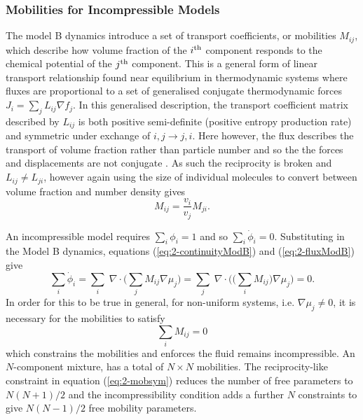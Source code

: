 \subsubsection{Mobilities for Incompressible Models} \label{subsec:mob}

The model B dynamics introduce a set of transport coefficients, or mobilities $M_{ij}$, which describe how volume fraction of the $i\textsuperscript{th}$ component responds to the chemical potential of the $j\textsuperscript{th}$ component. This is a general form of linear transport relationship found near equilibrium in thermodynamic systems where fluxes are proportional to a set of generalised conjugate thermodynamic forces $J_i = \sum_{j}L_{ij}\nabla f_{j}$. In this generalised description, the transport coefficient matrix described by $L_{ij}$ is both positive semi-definite (positive entropy production rate) and symmetric under exchange of $i, j \rightarrow j, i$. Here however, the flux describes the transport of volume fraction rather than particle number and so the the forces and displacements are not conjugate \cite{groot_non-equilibrium_1984}. As such the reciprocity is broken and $L_{ij} \neq L_{ji}$, however again using the size of individual molecules to convert between volume fraction and number density gives
\begin{equation}
    {M}_{ij} = \frac{v_i}{v_j}{M}_{ji}.
    \label{eq:2-mobsym}
\end{equation}

An incompressible model requires $\sum_i\phi_i = 1$ and so $\sum_i\dot{\phi}_i = 0$. Substituting in the Model B dynamics, equations (\ref{eq:2-continuityModB}) and (\ref{eq:2-fluxModB}) give
\begin{equation}
    \sum_i\dot{\phi}_i = \sum_i\;\nabla\cdot\bigg(\sum_j M_{ij}\nabla\mu_j\bigg) = \sum_j\;\nabla\cdot\bigg(\big(\sum_i M_{ij}\big)\nabla\mu_j\bigg) = 0.
\end{equation}
In order for this to be true in general, for non-uniform systems, i.e. $\nabla\mu_j \neq 0$, it is necessary for the mobilities to satisfy
\begin{equation}
    \sum_i M_{ij} = 0
    \label{eq:2-mobinc}
\end{equation}
which constrains the mobilities and enforces the fluid remains incompressible.\cite{kehr_mobility_1989} An $N$-component mixture,  has a total of $N\times N$ mobilities. The reciprocity-like constraint in equation (\ref{eq:2-mobsym}) reduces the number of free parameters to $N(N+1)/2$ and the incompressibility condition adds a further $N$ constraints to give $N(N-1)/2$ free mobility parameters.

